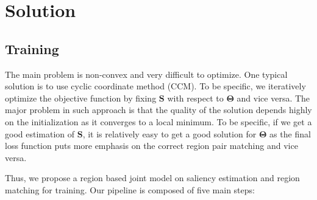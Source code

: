 \section{Solution}
\label{sec:solution}
\subsection{Training}
The main problem is non-convex and very difficult to optimize. 
One typical solution is to use cyclic coordinate method (CCM)\cite{GorskiPK07}. 
To be specific, we iteratively optimize the objective function by fixing $\mathbf{S}$ with respect to $\mathbf{\Theta}$ and vice versa. 
The major problem in such approach is that the quality of the solution depends highly on the initialization as it converges to a local minimum. 
To be specific, if we get a good estimation of $\mathbf{S}$, it is relatively easy to get a good solution for $\mathbf{\Theta}$ as the final loss function puts more emphasis on the correct region pair matching and vice versa. 

Thus, we propose a region based joint model on saliency estimation and region matching for training. Our pipeline is composed of five main steps: 

